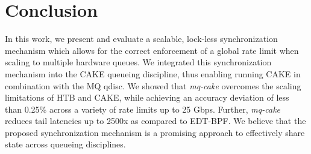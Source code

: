\section{Conclusion}
In this work, we present and evaluate a scalable, lock-less synchronization mechanism which allows for the correct enforcement of a global rate limit when scaling to multiple hardware queues.
We integrated this synchronization mechanism into the CAKE queueing discipline, thus enabling running CAKE in combination with the MQ qdisc.
We showed that \textit{mq-cake} overcomes the scaling limitations of HTB and CAKE, while achieving an accuracy deviation of less than 0.25\% across a variety of rate limits up to 25 Gbps.
Further, \textit{mq-cake} reduces tail latencies up to 2500x as compared to EDT-BPF.
We believe that the proposed synchronization mechanism is a promising approach to effectively share state across queueing disciplines.
